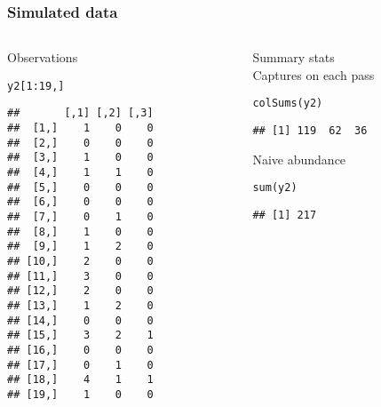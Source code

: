 \documentclass[color=usenames,dvipsnames]{beamer}\usepackage[]{graphicx}\usepackage[]{xcolor}
\makeatletter
\newcommand{\hlnum}[1]{\textcolor[rgb]{0.69,0.494,0}{#1}}%
\newcommand{\hlopt}[1]{\textcolor[rgb]{0,0,0}{#1}}%
\newcommand{\hldef}[1]{\textcolor[rgb]{0,0,0}{#1}}%
\newcommand{\hlkwd}[1]{\textcolor[rgb]{0.004,0.004,0.506}{#1}}%
\newenvironment{kframe}{%
 \def\at@end@of@kframe{}%
 \ifinner\ifhmode%
  \def\at@end@of@kframe{\end{minipage}}%
  \begin{minipage}{\columnwidth}%
 \fi\fi%
 \def\FrameCommand##1{\hskip\@totalleftmargin \hskip-\fboxsep
 \colorbox{shadecolor}{##1}\hskip-\fboxsep
     \hskip-\linewidth \hskip-\@totalleftmargin \hskip\columnwidth}%
 \MakeFramed {\advance\hsize-\width
   \@totalleftmargin\z@ \linewidth\hsize
   \@setminipage}}%
 {\par\unskip\endMakeFramed%
 \at@end@of@kframe}
\newenvironment{knitrout}{}{} %
\makeatother
\begin{document}
\begin{frame}[fragile]
  \frametitle{Simulated data}
  \begin{columns}
    \begin{column}{0.4\textwidth}
      \small
      Observations
  \vspace{-6pt}
\begin{knitrout}\scriptsize
{}\color{fgcolor}\begin{kframe}
\begin{alltt}
\hldef{y2[}\hlnum{1}\hlopt{:}\hlnum{19}\hldef{,]}
\end{alltt}
\begin{verbatim}
##       [,1] [,2] [,3]
##  [1,]    1    0    0
##  [2,]    0    0    0
##  [3,]    1    0    0
##  [4,]    1    1    0
##  [5,]    0    0    0
##  [6,]    0    0    0
##  [7,]    0    1    0
##  [8,]    1    0    0
##  [9,]    1    2    0
## [10,]    2    0    0
## [11,]    3    0    0
## [12,]    2    0    0
## [13,]    1    2    0
## [14,]    0    0    0
## [15,]    3    2    1
## [16,]    0    0    0
## [17,]    0    1    0
## [18,]    4    1    1
## [19,]    1    0    0
\end{verbatim}
\end{kframe}
\end{knitrout}
  \end{column}
  \begin{column}{0.6\textwidth}
    {\centering Summary stats \\}
    \vspace{24pt}
    \small
  \pause
  \vfill
  \small
  Captures on each pass
  \vspace{-6pt}
\begin{knitrout}\scriptsize
{}\color{fgcolor}\begin{kframe}
\begin{alltt}
\hlkwd{colSums}\hldef{(y2)}
\end{alltt}
\begin{verbatim}
## [1] 119  62  36
\end{verbatim}
\end{kframe}
\end{knitrout}
  \pause
  \vfill
  Naive abundance
  \vspace{-6pt}
\begin{knitrout}\scriptsize
{}\color{fgcolor}\begin{kframe}
\begin{alltt}
\hlkwd{sum}\hldef{(y2)}
\end{alltt}
\begin{verbatim}
## [1] 217
\end{verbatim}
\end{kframe}
\end{knitrout}

  \end{column}
  \end{columns}
\end{frame}
\end{document}
